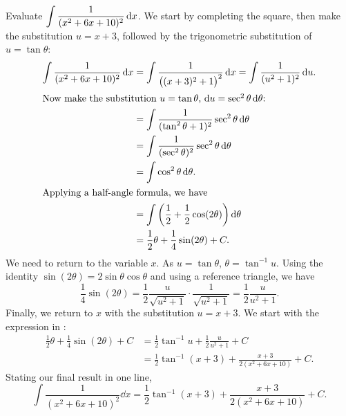 \begin{example}\label{ex_trigsub7}%
Evaluate $\displaystyle\int\frac1{(x^2+6x+10)^2}\operatorname{d}\! x$.
\solution
We start by completing the square, then make the substitution $u=x+3$, followed by the trigonometric substitution of $u=\tan\theta$:
\begin{align}
\int \frac1{(x^2+6x+10)^2}\dd x &=\int \frac1{\bigl((x+3)^2+1\bigr)^2}\dd x = \int \frac1{(u^2+1)^2}\dd u. \notag\\
\intertext{Now make the substitution \intertextmath{u=\tan\theta}, \intertextmath{\dd u=\sec^2\theta\dd\theta}:}
   &=	\int \frac1{(\tan^2\theta+1)^2}\sec^2\theta\dd\theta\notag\\
	&= \int\frac 1{(\sec^2\theta)^2}\sec^2\theta\dd\theta\notag\\
	&= \int \cos^2\theta\dd\theta.\notag\\
	\intertext{Applying a half-angle formula, we have}
	&= \int \left(\frac12 +\frac12\cos(2\theta)\right)\dd\theta \notag\\
	&= \frac12\theta + \frac14\sin(2\theta) + C.\label{eq:extrigsub7}
\end{align}
We need to return to the variable $x$. As $u=\tan\theta$, $\theta = \tan^{-1}u$. Using the identity $\sin(2\theta) = 2\sin\theta\cos\theta$ and using a reference triangle, %
we have 
\[\frac14\sin(2\theta) = \frac12\frac u{\sqrt{u^2+1}}\cdot\frac 1{\sqrt{u^2+1}} = \frac12\frac u{u^2+1}.\]
Finally, we return to $x$ with the substitution $u=x+3$. We start with the expression in :
\begin{align*}
	\frac12\theta + \frac14\sin(2\theta) + C
	&= \frac12\tan^{-1}u + \frac12\frac{u}{u^2+1}+C\\
	&= \frac12\tan^{-1}(x+3) + \frac{x+3}{2(x^2+6x+10)}+C.
\end{align*}
Stating our final result in one line,
\[
\int\frac1{(x^2+6x+10)^2}\dd x=\frac12\tan^{-1}(x+3)+\frac{x+3}{2(x^2+6x+10)}+C.
\]
\end{example}

